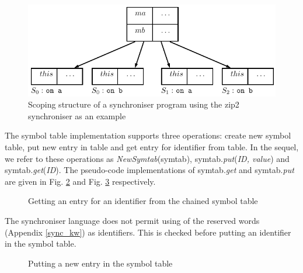   \begin{figure}[h!]
  \centering
  \includegraphics[scale=0.8]{figs/chapter_02_symtab_chain.pdf}
  \caption{Scoping structure of a synchroniser program using the zip2 synchroniser as an example}
  \label{fig:symtab_chain}
  \end{figure}

The symbol table implementation supports three operations: create new symbol table, put new entry in table and get entry for identifier from table. In the sequel, we refer to these operations as \emph{NewSymtab}(symtab), symtab.\emph{put}(\emph{ID, value}) and symtab.\emph{get}(\emph{ID}). The pseudo-code implementations of symtab.\emph{get} and symtab.\emph{put} are given in Fig. \ref{symtab_get} and Fig. \ref{symtab_put} respectively.

\begin{figure}%
\noindent{}
\caption{Getting an entry for an identifier from the chained symbol table\label{symtab_get}}
\end{figure}

The synchroniser language does not permit using of the reserved words (Appendix \ref{sync_kw}) as identifiers. This is checked before putting an identifier in the symbol table.

\begin{figure}%
\noindent{}
\caption{Putting a new entry in the symbol table\label{symtab_put}}
\end{figure}



